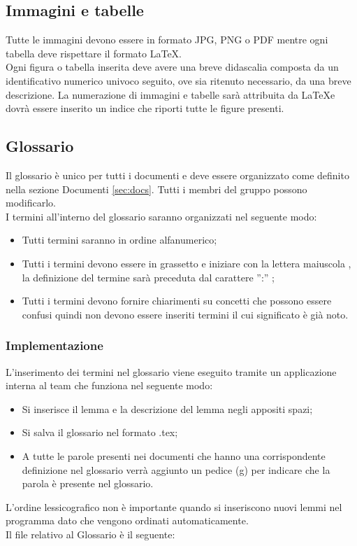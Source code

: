 {		\subsection{Immagini e tabelle}{
			\label{sub:img}
			Tutte le immagini devono essere in formato JPG, PNG o PDF mentre ogni tabella deve rispettare il formato \LaTeX.\\
			Ogni figura o tabella inserita deve avere una breve didascalia composta da un identificativo numerico univoco seguito, ove sia ritenuto necessario, da una breve descrizione. La numerazione di immagini e tabelle sarà attribuita da \LaTeX e dovrà essere inserito un indice che riporti tutte le figure presenti.\\			
			}
		}
\subsection{Glossario}{
 	Il glossario è unico per tutti i documenti e deve essere organizzato come definito nella sezione Documenti \ref{sec:docs}. Tutti i membri del gruppo possono modificarlo.\\
 	I termini all'interno del glossario saranno organizzati nel seguente modo:
 	\begin{itemize}
	 	\item Tutti termini saranno in ordine alfanumerico;
	 	\item Tutti i termini devono essere in grassetto e iniziare con la lettera maiuscola , la definizione del termine sarà preceduta dal carattere '':'' ;
	 	\item Tutti i termini devono fornire chiarimenti su concetti che possono essere confusi quindi non devono essere inseriti termini il cui significato è già noto.
 	\end{itemize}	
   \subsubsection{Implementazione}
      L'inserimento dei termini nel glossario viene eseguito tramite un applicazione interna al team che funziona nel seguente modo:
      \begin{itemize}
	      \item Si inserisce il lemma e la descrizione del lemma negli appositi spazi;
	      \item Si salva il glossario nel formato .tex;
	      \item A tutte le parole presenti nei documenti che hanno una corrispondente definizione nel glossario  verrà aggiunto un pedice (g) per indicare che la parola è presente nel glossario.
      \end{itemize}  
   L'ordine lessicografico non è importante quando si inseriscono nuovi lemmi nel programma dato che vengono ordinati automaticamente.\\
   Il file relativo al Glossario è il seguente: \href{run:../../Esterni/\fGlossario}{\fEscapeGlossario}
}